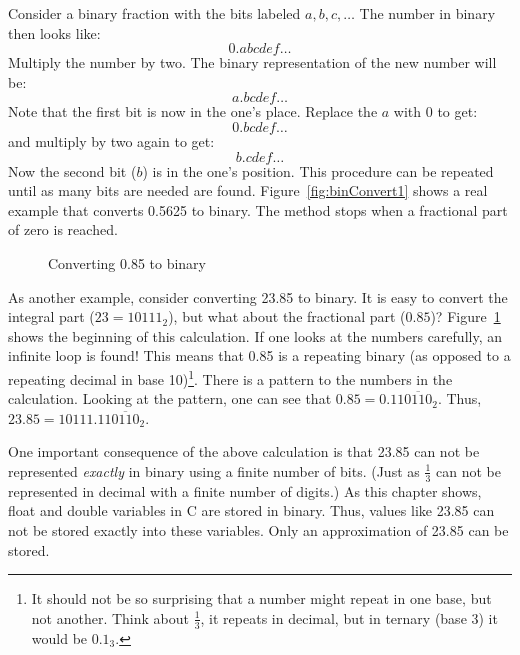 Consider a binary fraction with the bits labeled $a, b, c, \ldots$ The number
in binary then looks like:
\[ 0.abcdef\ldots \]
Multiply the number by two. The binary representation of the new number will
be:
\[ a.bcdef\ldots \]
Note that the first bit is now in the one's place. Replace the $a$ with $0$
to get:
\[ 0.bcdef\ldots \]
and multiply by two again to get:
\[ b.cdef\ldots \]
Now the second bit ($b$) is in the one's position. This procedure can be 
repeated until as many bits are needed are found. Figure~\ref{fig:binConvert1}
shows a real example that converts 0.5625 to binary. The method stops when
a fractional part of zero is reached.

\begin{figure}[t]
\centering
{}
\caption{Converting 0.85 to binary\label{fig:binConvert2}}
\end{figure}

As another example, consider converting 23.85 to binary. It is easy to 
convert the integral part ($23 = 10111_2$), but what about the fractional
part ($0.85$)? Figure~\ref{fig:binConvert2} shows the beginning of this
calculation. If one looks at the numbers carefully, an infinite loop is
found! This means that 0.85 is a repeating binary (as opposed to a 
repeating decimal in base 10)\footnote{It should not be so surprising that
a number might repeat in one base, but not another. Think about 
$\frac{1}{3}$, it repeats in decimal, but in ternary (base 3) it would be
$0.1_3$.}. There is a pattern to the numbers in the calculation. Looking
at the pattern, one can see that $0.85 = 0.11\overline{0110}_2$. Thus,
$23.85 = 10111.11\overline{0110}_2$.

One important consequence of the above calculation is that 23.85 can 
not be represented \emph{exactly} in binary using a finite number of bits.
(Just as $\frac{1}{3}$ can not be represented in decimal with a finite
number of digits.) As this chapter shows, {\code float} and {\code double}
variables in C are stored in binary. Thus, values like 23.85 can not be
stored exactly into these variables. Only an approximation of 23.85 can be
stored.

